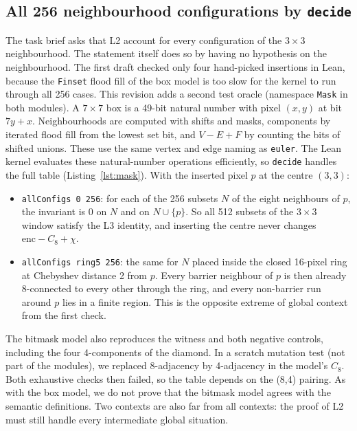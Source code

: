 \documentclass[11pt]{article}
\theoremstyle{definition}
\theoremstyle{remark}
\begin{document}
\subsection{All 256 neighbourhood configurations by \texttt{decide}}\label{sec:allconfigs}

The task brief asks that L2 account for every configuration of the $3\times3$
neighbourhood. The statement itself does so by having no hypothesis on the
neighbourhood. The first draft checked only four hand-picked insertions in Lean,
because the \texttt{Finset} flood fill of the box model is too slow for the kernel
to run through all 256 cases. This revision adds a second test oracle (namespace
\texttt{Mask} in both modules). A $7\times7$ box is a 49-bit natural number with
pixel $(x,y)$ at bit $7y+x$. Neighbourhoods are computed with shifts and masks,
components by iterated flood fill from the lowest set bit, and $V-E+F$ by
counting the bits of shifted unions. These use the same vertex and edge naming as
\texttt{euler}. The Lean kernel evaluates these natural-number operations
efficiently, so \texttt{decide} handles the full table
(Listing~\ref{lst:mask}). With the inserted pixel $p$ at the centre $(3,3)$:
\begin{itemize}
\item \texttt{allConfigs 0 256}: for each of the 256 subsets $N$ of the eight
  neighbours of $p$, the invariant is $0$ on $N$ and on $N\cup\{p\}$. So all 512
  subsets of the $3\times3$ window satisfy the L3 identity, and inserting the
  centre never changes $\mathrm{enc}-C_8+\chi$.
\item \texttt{allConfigs ring5 256}: the same for $N$ placed inside the closed
  16-pixel ring at Chebyshev distance 2 from $p$. Every barrier neighbour of $p$
  is then already 8-connected to every other through the ring, and every
  non-barrier run around $p$ lies in a finite region. This is the opposite
  extreme of global context from the first check.
\end{itemize}
The bitmask model also reproduces the witness and both negative controls,
including the four 4-components of the diamond. In a scratch mutation test (not
part of the modules), we replaced 8-adjacency by 4-adjacency in the model's
$C_8$. Both exhaustive checks then failed, so the table depends on the (8,4)
pairing. As with the box model, we do not prove that the bitmask model agrees
with the semantic definitions. Two contexts are also far from all contexts: the
proof of L2 must still handle every intermediate global situation.
\end{document}
